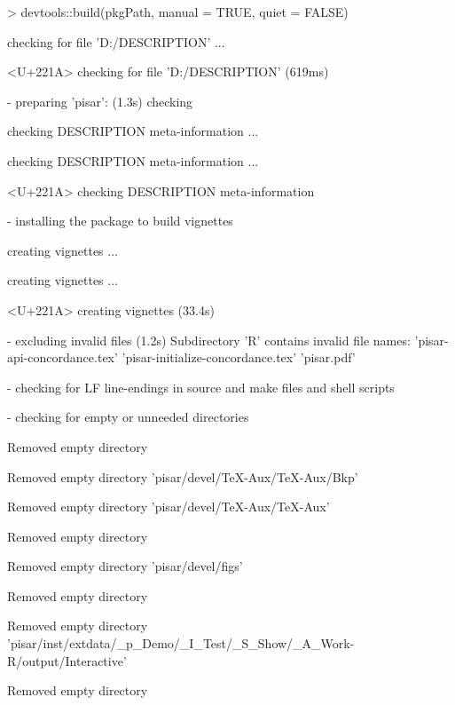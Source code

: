 \documentclass[a4paper,12pt]{article}\usepackage[]{graphicx}\usepackage[]{color}
\begin{document}
\begin{Schunk}
\begin{Sinput}
> devtools::build(pkgPath, manual = TRUE, quiet = FALSE)
\end{Sinput}
\begin{Soutput}
  
  
  
   checking for file 'D:\OMIKE\pisar/DESCRIPTION' ...
  
<U+221A>  checking for file 'D:\OMIKE\pisar/DESCRIPTION' (619ms)

  
  
  
-  preparing 'pisar': (1.3s)
   checking 
  
   checking DESCRIPTION meta-information ...
  
   checking DESCRIPTION meta-information ... 
  
<U+221A>  checking DESCRIPTION meta-information

  
  
  
-  installing the package to build vignettes

  
  
  
   creating vignettes ...
  
   creating vignettes ... 
  
<U+221A>  creating vignettes (33.4s)

  
  
  
-  excluding invalid files (1.2s)
   Subdirectory 'R' contains invalid file names:
     'pisar-api-concordance.tex' 'pisar-initialize-concordance.tex'
     'pisar.pdf'

  
  
  
-  checking for LF line-endings in source and make files and shell scripts

  
  
  
-  checking for empty or unneeded directories

  
Removed empty directory 
  
   Removed empty directory 'pisar/devel/TeX-Aux/TeX-Aux/Bkp'

  
   Removed empty directory 'pisar/devel/TeX-Aux/TeX-Aux'

  
Removed empty directory 
  
   Removed empty directory 'pisar/devel/figs'

  
Removed empty directory 
  
   Removed empty directory 'pisar/inst/extdata/_p_Demo/_I_Test/_S_Show/_A_Work-R/output/Interactive'

  
Removed empty directory 
  

\end{Soutput}
\end{Schunk}
\end{document}
